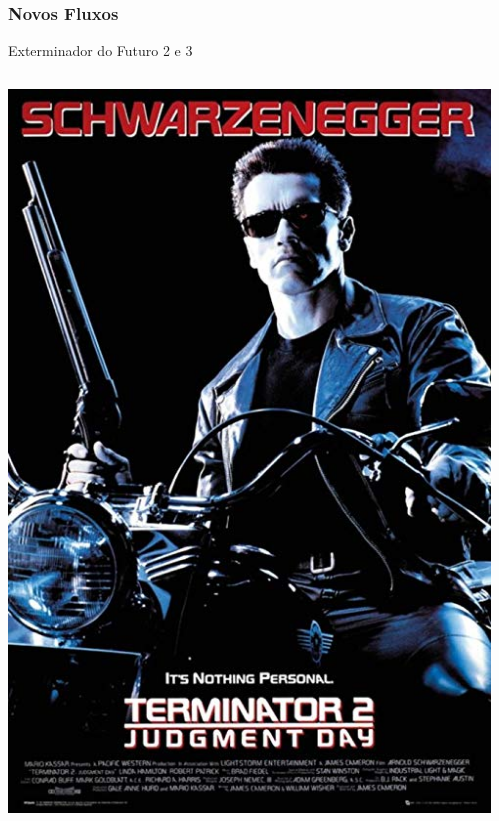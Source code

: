 \begin{frame}
    \frametitle{Novos Fluxos}
    
    \alert{Exterminador do Futuro 2 e 3}

    \begin{columns}
        \begin{column}{0.4\textwidth}
            \includegraphics[height=0.8\textheight]{img/posters/terminator_2.jpg}
        \end{column}
        \begin{column}{0.4\textwidth}

\end{column}
\end{columns}
\end{frame}
